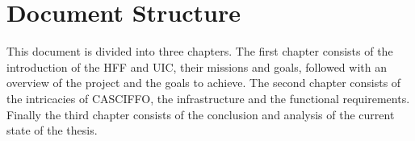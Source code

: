 \section{Document Structure}
This document is divided into three chapters. The first chapter consists of the introduction of the HFF and UIC, their missions and goals, followed with an overview of the project and the goals to achieve. The second chapter consists of the intricacies of CASCIFFO, the infrastructure and the functional requirements. Finally the third chapter consists of the conclusion and analysis of the current state of the thesis.  

